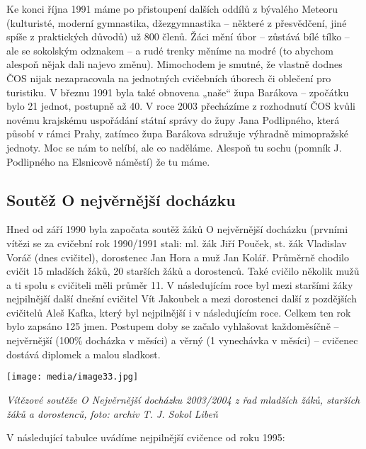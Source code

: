 Ke konci října 1991 máme po přistoupení dalších oddílů z bývalého
Meteoru (kulturisté, moderní gymnastika, džezgymnastika -- některé z
přesvědčení, jiné spíše z praktických důvodů) už 800 členů. Žáci mění
úbor -- zůstává bílé tílko -- ale se sokolským odznakem -- a rudé trenky
měníme na modré (to abychom alespoň nějak dali najevo změnu). Mimochodem
je smutné, že vlastně dodnes ČOS nijak nezapracovala na jednotných
cvičebních úborech či oblečení pro turistiku. V březnu 1991 byla také
obnovena „naše`` župa Barákova -- zpočátku bylo 21 jednot, postupně až
40. V roce 2003 přecházíme z rozhodnutí ČOS kvůli novému krajskému
uspořádání státní správy do župy Jana Podlipného, která působí v rámci
Prahy, zatímco župa Barákova sdružuje výhradně mimopražské jednoty. Moc
se nám to nelíbí, ale co naděláme. Alespoň tu sochu (pomník J.
Podlipného na Elsnicově náměstí) že tu máme.

\subsection{Soutěž O nejvěrnější
docházku}\label{soutux11bux17e-o-nejvux11brnux11bjux161uxed-dochuxe1zku}

Hned od září 1990 byla započata soutěž žáků O nejvěrnější docházku
(prvními vítězi se za cvičební rok 1990/1991 stali: ml. žák Jiří Pouček,
st. žák Vladislav Voráč (dnes cvičitel), dorostenec Jan Hora a muž Jan
Kolář. Průměrně chodilo cvičit 15 mladších žáků, 20 starších žáků a
dorostenců. Také cvičilo několik mužů a ti spolu s cvičiteli měli průměr
11. V následujícím roce byl mezi staršími žáky nejpilnější další dnešní
cvičitel Vít Jakoubek a mezi dorostenci další z pozdějších cvičitelů
Aleš Kafka, který byl nejpilnější i v následujícím roce. Celkem ten rok
bylo zapsáno 125 jmen. Postupem doby se začalo vyhlašovat každoměsíčně
-- nejvěrnější (100\% docházka v měsíci) a věrný (1 vynechávka v měsíci)
-- cvičenec dostává diplomek a malou sladkost.

\texttt{[image: media/image33.jpg]}

\emph{Vítězové soutěže O Nejvěrnější docházku 2003/2004 z řad mladších
žáků, starších žáků a dorostenců,} \emph{foto: archiv T. J. Sokol Libeň}

V následující tabulce uvádíme nejpilnější cvičence od roku 1995:

